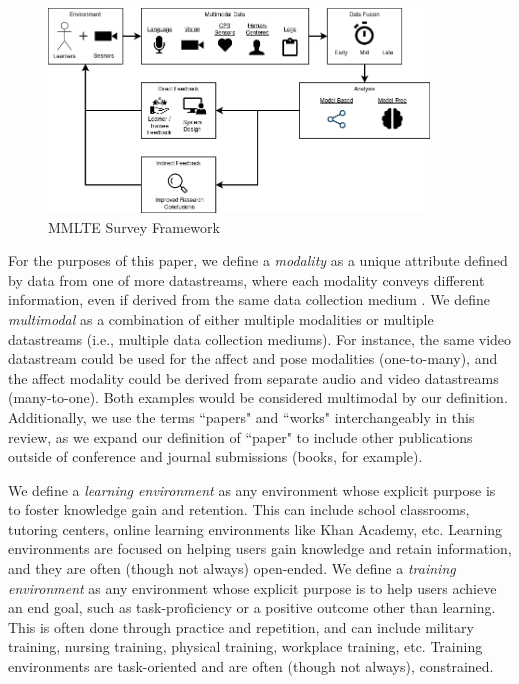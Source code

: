 \documentclass[manuscript,screen,review]{acmart}
\begin{document}

\begin{figure}[htbp]
    \centering
    \includegraphics[width=0.9\textwidth]{img/MMLTE_Framework.png}
    \caption{MMLTE Survey Framework}
    \label{fig:framework}
\end{figure}


For the purposes of this paper, we define a \textit{modality} as a unique attribute defined by data from one of more datastreams, where each modality conveys different information, even if derived from the same data collection medium \cite{Ochoa?}. We define \textit{multimodal} as a combination of either multiple modalities or multiple datastreams (i.e., multiple data collection mediums). For instance, the same video datastream could be used for the affect and pose modalities (one-to-many), and the affect modality could be derived from separate audio and video datastreams (many-to-one). Both examples would be considered multimodal by our definition. Additionally, we use the terms ``papers" and ``works" interchangeably in this review, as we expand our definition of ``paper" to include other publications outside of conference and journal submissions (books, for example).
 
We define a \textit{learning environment} as any environment whose explicit purpose is to foster knowledge gain and retention. This can include school classrooms, tutoring centers, online learning environments like Khan Academy, etc. Learning environments are focused on helping users gain knowledge and retain information, and they are often (though not always) open-ended. We define a \textit{training environment} as any environment whose explicit purpose is to help users achieve an end goal, such as task-proficiency or a positive outcome other than learning. This is often done through practice and repetition, and can include military training, nursing training, physical training, workplace training, etc. Training environments are task-oriented and are often (though not always), constrained. 
\end{document}
